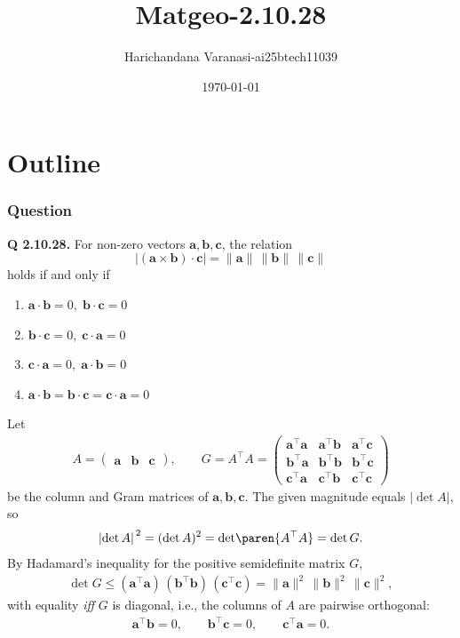 \documentclass{beamer}
\title{Matgeo-2.10.28}
\author{Harichandana Varanasi-ai25btech11039}
\date{\today}
\theoremstyle{remark}
\providecommand{\abs}[1]{\left\vert#1\right\vert}
\newcommand{\myvec}[1]{\ensuremath{\begin{pmatrix}#1\end{pmatrix}}}
\let\vec\mathbf
\begin{document}
\begin{frame}
\titlepage
\end{frame}

\section*{Outline}

\begin{frame}
\frametitle{Question}
\textbf{Q 2.10.28.}
For non-zero vectors $\vec a,\vec b,\vec c$, the relation
\[
\bigl|(\vec a\times \vec b)\cdot \vec c\bigr|=\|\vec a\|\,\|\vec b\|\,\|\vec c\|
\]
holds if and only if
\begin{enumerate}
  \item $\vec a\cdot\vec b=0,\; \vec b\cdot\vec c=0$
  \item $\vec b\cdot\vec c=0,\; \vec c\cdot\vec a=0$
  \item $\vec c\cdot\vec a=0,\; \vec a\cdot\vec b=0$
  \item $\vec a\cdot\vec b=\vec b\cdot\vec c=\vec c\cdot\vec a=0$
\end{enumerate}


\end{frame}
%
\begin{frame}

\begin{solution}
Let
\begin{align}
A=\myvec{\vec{a}&\vec{b}&\vec{c}},\qquad 
G=A^\top A
=\myvec{
\vec{a}^\top\vec{a} & \vec{a}^\top\vec{b} & \vec{a}^\top\vec{c}\\
\vec{b}^\top\vec{a} & \vec{b}^\top\vec{b} & \vec{b}^\top\vec{c}\\
\vec{c}^\top\vec{a} & \vec{c}^\top\vec{b} & \vec{c}^\top\vec{c}}
\label{eq:gram-matrix}
\end{align}
be the column and Gram matrices of $\vec{a},\vec{b},\vec{c}$.
The given magnitude equals $\abs{\det A}$, so
\begin{align}
\abs{\det A}^{\,2}=(\det A)^2
=\det\!\paren{A^\top A}
=\det G .
\label{eq:det-square}
\end{align}
By Hadamard’s inequality for the positive semidefinite matrix $G$,
\begin{align}
\det G
\le (\vec{a}^\top\vec{a})\,
   (\vec{b}^\top\vec{b})\,
   (\vec{c}^\top\vec{c})
= \|\vec{a}\|^{2}\,\|\vec{b}\|^{2}\,\|\vec{c}\|^{2},
\label{eq:hadamard-bound}
\end{align}
with equality \emph{iff} $G$ is diagonal, i.e., the columns of $A$ are pairwise orthogonal:
\begin{align}
\vec{a}^\top\vec{b}=0,\qquad
\vec{b}^\top\vec{c}=0,\qquad
\vec{c}^\top\vec{a}=0 .
\label{eq:orth}
\end{align}
\end{solution}
\end{frame}
\end{document}
